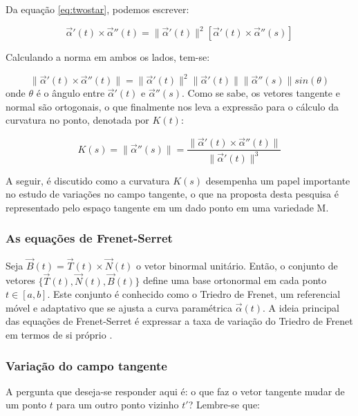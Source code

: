 \documentclass[a4paper,12pt]{article}
\begin{document}
Da equação \eqref{eq:twostar}, podemos escrever:

\begin{equation}
	\vec{\alpha}'(t) \times \vec{\alpha}''(t) = \lVert \vec{\alpha}'(t) \rVert^2 \left[ \vec{\alpha}'(t) \times \vec{\alpha}''(s) \right]
\end{equation}

Calculando a norma em ambos os lados, tem-se:

\begin{equation}
	\lVert \vec{\alpha}'(t) \times \vec{\alpha}''(t) \rVert = \lVert \vec{\alpha}'(t) \rVert^2 \lVert \vec{\alpha}'(t) \rVert \lVert \vec{\alpha}''(s) \rVert sin(\theta)
\end{equation} onde $\theta$ é o ângulo entre $\vec{\alpha}'(t)$ e $\vec{\alpha}''(s)$. Como se sabe, os vetores tangente e normal são ortogonais, o que finalmente nos leva a expressão para o cálculo da curvatura no ponto, denotada por $K(t)$:

\begin{equation}
	K(s) = \lVert \vec{\alpha}''(s) \rVert = \frac{\lVert \vec{\alpha}'(t) \times \vec{\alpha}''(t) \rVert}{\lVert \vec{\alpha}'(t) \rVert^3}
\end{equation}

A seguir, é discutido como a curvatura $K(s)$ desempenha um papel importante no estudo de variações no campo tangente, o que na proposta desta pesquisa é representado pelo espaço tangente em um dado ponto em uma variedade M.

\subsubsection{As equações de Frenet-Serret}

Seja $\vec{B}(t) = \vec{T}(t) \times \vec{N}(t)$ o vetor binormal unitário. Então, o conjunto de vetores $\{ \vec{T}(t), \vec{N}(t), \vec{B}(t) \}$ define uma base ortonormal em cada ponto $t \in [a, b]$. Este conjunto é conhecido como o Triedro de Frenet, um referencial móvel e adaptativo que se ajusta a curva paramétrica $\vec{\alpha}(t)$. A ideia principal das equações de Frenet-Serret é expressar a taxa de variação do Triedro de Frenet em termos de si próprio \cite{Serret,Frenet}.

\subsubsection*{Variação do campo tangente}

A pergunta que deseja-se responder aqui é: o que faz o vetor tangente mudar de um ponto $t$ para um outro ponto vizinho $t'$? Lembre-se que:
\end{document}
